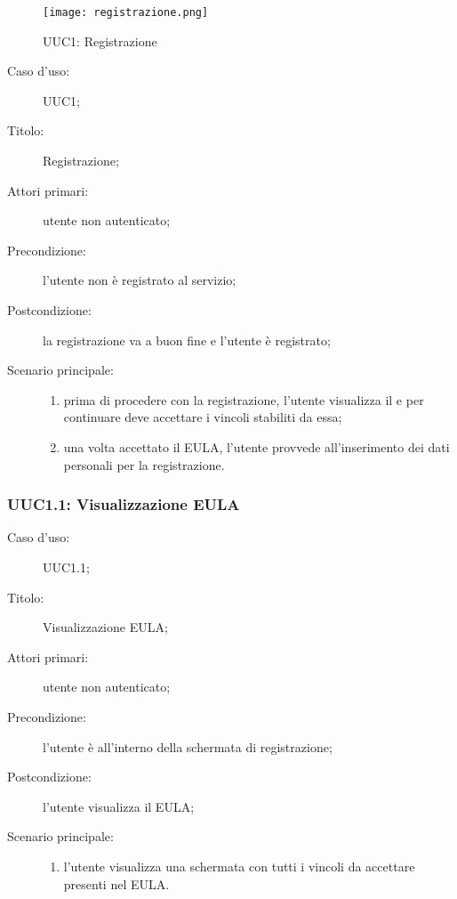 \documentclass[../../../analisi-dei-requisiti.tex]{subfiles}
\begin{document}
\begin{figure}[H]
  \centering
  \texttt{[image: registrazione.png]}
  \caption{UUC1: Registrazione}%
  \label{fig:uuc1}
\end{figure}

\begin{description}
  \item[Caso d’uso:] UUC1;
  \item[Titolo:] Registrazione;
  \item[Attori primari:] utente non autenticato;
  \item[Precondizione:] l'utente non è registrato al servizio;
  \item[Postcondizione:] la registrazione va a buon fine e l'utente è registrato;
  \item[Scenario principale:]
        \begin{enumerate}
          \item prima di procedere con la registrazione, l'utente visualizza il  e per continuare deve accettare i vincoli stabiliti da essa;
          \item una volta accettato il EULA, l'utente provvede all'inserimento dei dati personali per la registrazione.
        \end{enumerate}
\end{description}


\subsubsection{UUC1.1: Visualizzazione EULA}%
\label{subs:UUC1.1}
\begin{description}
  \item[Caso d’uso:] UUC1.1;
  \item[Titolo:] Visualizzazione EULA;
  \item[Attori primari:] utente non autenticato;
  \item[Precondizione:] l'utente è all'interno della schermata di registrazione;
  \item[Postcondizione:] l'utente visualizza il EULA;
  \item[Scenario principale:]
        \begin{enumerate}
          \item l'utente visualizza una schermata con tutti i vincoli da accettare presenti nel EULA.
        \end{enumerate}
\end{description}
\end{document}
